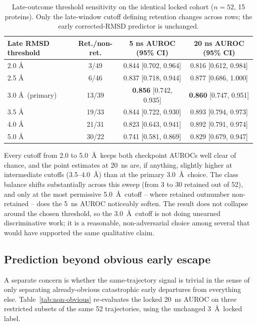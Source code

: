 \documentclass[11pt]{article}
\begin{document}
\begin{table}[htbp]
\centering
\caption{Late-outcome threshold sensitivity on the identical locked cohort ($n=52$, 15 proteins). Only the late-window cutoff defining retention changes across rows; the early corrected-RMSD predictor is unchanged.}
\label{tab:threshold-sensitivity}
\small
\setlength{\tabcolsep}{4pt}
\begin{tabular}{lccc}
\toprule
Late RMSD threshold & Ret./non-ret. & 5 ns AUROC (95\% CI) & 20 ns AUROC (95\% CI) \\
\midrule
2.0 \AA & 3/49  & 0.844 [0.702, 0.964] & 0.816 [0.612, 0.984] \\
2.5 \AA & 6/46  & 0.837 [0.718, 0.944] & 0.877 [0.686, 1.000] \\
3.0 \AA\ (primary) & 13/39 & \textbf{0.856} [0.742, 0.935] & \textbf{0.860} [0.747, 0.951] \\
3.5 \AA & 19/33 & 0.844 [0.722, 0.930] & 0.893 [0.794, 0.973] \\
4.0 \AA & 21/31 & 0.823 [0.643, 0.941] & 0.892 [0.791, 0.974] \\
5.0 \AA & 30/22 & 0.741 [0.581, 0.869] & 0.829 [0.679, 0.947] \\
\bottomrule
\end{tabular}
\end{table}

Every cutoff from 2.0 to 5.0~\AA\ keeps both checkpoint AUROCs well clear of chance, and the point estimates at 20~ns are, if anything, slightly higher at intermediate cutoffs (3.5--4.0~\AA) than at the primary 3.0~\AA\ choice. The class balance shifts substantially across this sweep (from 3 to 30 retained out of 52), and only at the most permissive 5.0~\AA\ cutoff -- where retained outnumber non-retained -- does the 5~ns AUROC noticeably soften. The result does not collapse around the chosen threshold, so the 3.0~\AA\ cutoff is not doing unearned discriminative work; it is a reasonable, non-adversarial choice among several that would have supported the same qualitative claim.

\subsection{Prediction beyond obvious early escape}

A separate concern is whether the same-trajectory signal is trivial in the sense of only separating already-obvious catastrophic early departures from everything else. Table~\ref{tab:non-obvious} re-evaluates the locked 20~ns AUROC on three restricted subsets of the same 52 trajectories, using the unchanged 3~\AA\ locked label.
\end{document}
